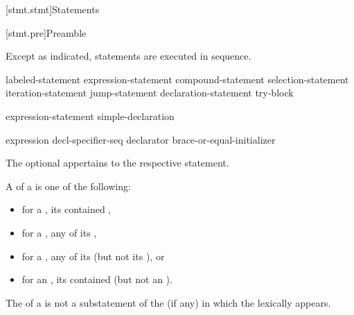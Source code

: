 [stmt.stmt]{Statements}%



[stmt.pre]{Preamble}

\pnum
Except as indicated, statements are executed in sequence.

\begin{bnf}
\br
    labeled-statement\br
     expression-statement\br
     compound-statement\br
     selection-statement\br
     iteration-statement\br
     jump-statement\br
    declaration-statement\br
     try-block
\end{bnf}

\begin{bnf}
\br
    expression-statement\br
    simple-declaration
\end{bnf}

\begin{bnf}
\br
    expression\br
     decl-specifier-seq declarator brace-or-equal-initializer
\end{bnf}

The optional  appertains to the respective statement.

\pnum
A  of a  is one of the following:
\begin{itemize}
\item
  for a , its contained ,
\item
  for a , any  of its ,
\item
  for a , any of its  (but not its ), or
\item
  for an , its contained  (but not an ).
\end{itemize}
\begin{note}
The  of a 
is not a substatement of the  (if any)
in which the  lexically appears.
\end{note}

